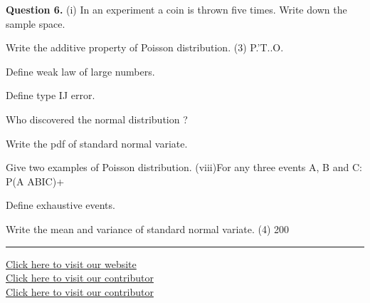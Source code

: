 \documentclass[11pt,a4paper]{article}
\begin{document}
\medskip\noindent\textbf{Question 6.} (i) In an experiment a coin is thrown five times.
Write down the sample space.
  \begin{parts}
    \item Write the additive property of Poisson
    distribution.
    (3) P.'T..O.
    \item Define weak law of large numbers.
    \item Define type IJ error.
    \item Who discovered the normal distribution ?
    \item Write the pdf of standard normal variate.
    \item Give two examples of Poisson distribution.
    (viii)For any three events A, B and C: P(A ABIC)+
    \item Define exhaustive events.
    \item Write the mean and variance of standard normal
    variate.
    (4) 200
  \end{parts}

\vfill
\rule{\linewidth}{0.4pt}
\begin{center}\small
\href{https://bhu-exam.vercel.app/}{Click here to visit our website}\\[4pt]\href{https://me-aryan.vercel.app/}{Click here to visit our contributor}\\[4pt]\href{https://quashan-me.vercel.app/}{Click here to visit our contributor}
\end{center}
\end{document}

